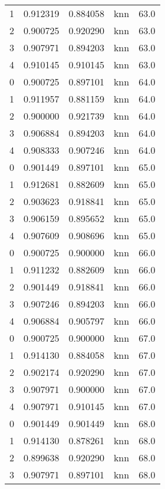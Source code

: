 \begin{tabular}{rrrlr}
     1 & 0.912319 & 0.884058 &      knn &       63.0 \\
     2 & 0.900725 & 0.920290 &      knn &       63.0 \\
     3 & 0.907971 & 0.894203 &      knn &       63.0 \\
     4 & 0.910145 & 0.910145 &      knn &       63.0 \\
     0 & 0.900725 & 0.897101 &      knn &       64.0 \\
     1 & 0.911957 & 0.881159 &      knn &       64.0 \\
     2 & 0.900000 & 0.921739 &      knn &       64.0 \\
     3 & 0.906884 & 0.894203 &      knn &       64.0 \\
     4 & 0.908333 & 0.907246 &      knn &       64.0 \\
     0 & 0.901449 & 0.897101 &      knn &       65.0 \\
     1 & 0.912681 & 0.882609 &      knn &       65.0 \\
     2 & 0.903623 & 0.918841 &      knn &       65.0 \\
     3 & 0.906159 & 0.895652 &      knn &       65.0 \\
     4 & 0.907609 & 0.908696 &      knn &       65.0 \\
     0 & 0.900725 & 0.900000 &      knn &       66.0 \\
     1 & 0.911232 & 0.882609 &      knn &       66.0 \\
     2 & 0.901449 & 0.918841 &      knn &       66.0 \\
     3 & 0.907246 & 0.894203 &      knn &       66.0 \\
     4 & 0.906884 & 0.905797 &      knn &       66.0 \\
     0 & 0.900725 & 0.900000 &      knn &       67.0 \\
     1 & 0.914130 & 0.884058 &      knn &       67.0 \\
     2 & 0.902174 & 0.920290 &      knn &       67.0 \\
     3 & 0.907971 & 0.900000 &      knn &       67.0 \\
     4 & 0.907971 & 0.910145 &      knn &       67.0 \\
     0 & 0.901449 & 0.901449 &      knn &       68.0 \\
     1 & 0.914130 & 0.878261 &      knn &       68.0 \\
     2 & 0.899638 & 0.920290 &      knn &       68.0 \\
     3 & 0.907971 & 0.897101 &      knn &       68.0 \\

\end{tabular}
